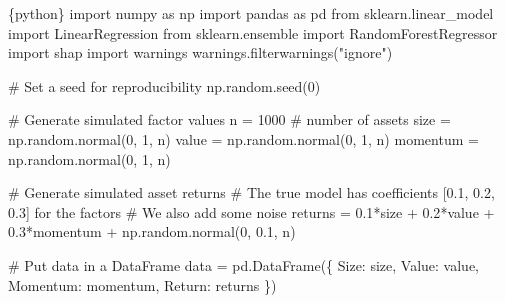 \documentclass[
  letterpaper,
  DIV=11,
  numbers=noendperiod]{scrartcl}
\newenvironment{Shaded}{\begin{snugshade}}{\end{snugshade}}
\newcommand{\CommentTok}[1]{\textcolor[rgb]{0.37,0.37,0.37}{#1}}
\newcommand{\DecValTok}[1]{\textcolor[rgb]{0.68,0.00,0.00}{#1}}
\newcommand{\FloatTok}[1]{\textcolor[rgb]{0.68,0.00,0.00}{#1}}
\newcommand{\ImportTok}[1]{\textcolor[rgb]{0.00,0.46,0.62}{#1}}
\newcommand{\InformationTok}[1]{\textcolor[rgb]{0.37,0.37,0.37}{#1}}
\newcommand{\NormalTok}[1]{\textcolor[rgb]{0.00,0.23,0.31}{#1}}
\newcommand{\OperatorTok}[1]{\textcolor[rgb]{0.37,0.37,0.37}{#1}}
\newcommand{\StringTok}[1]{\textcolor[rgb]{0.13,0.47,0.30}{#1}}
\begin{document}
\begin{Shaded}
\begin{Highlighting}[]
\InformationTok{\textasciigrave{}\textasciigrave{}\textasciigrave{}\{python\}}
\ImportTok{import}\NormalTok{ numpy }\ImportTok{as}\NormalTok{ np}
\ImportTok{import}\NormalTok{ pandas }\ImportTok{as}\NormalTok{ pd}
\ImportTok{from}\NormalTok{ sklearn.linear\_model }\ImportTok{import}\NormalTok{ LinearRegression}
\ImportTok{from}\NormalTok{ sklearn.ensemble }\ImportTok{import}\NormalTok{ RandomForestRegressor}
\ImportTok{import}\NormalTok{ shap}
\ImportTok{import}\NormalTok{ warnings}
\NormalTok{warnings.filterwarnings(}\StringTok{"ignore"}\NormalTok{)}

\CommentTok{\# Set a seed for reproducibility}
\NormalTok{np.random.seed(}\DecValTok{0}\NormalTok{)}

\CommentTok{\# Generate simulated factor values}
\NormalTok{n }\OperatorTok{=} \DecValTok{1000}  \CommentTok{\# number of assets}
\NormalTok{size }\OperatorTok{=}\NormalTok{ np.random.normal(}\DecValTok{0}\NormalTok{, }\DecValTok{1}\NormalTok{, n)}
\NormalTok{value }\OperatorTok{=}\NormalTok{ np.random.normal(}\DecValTok{0}\NormalTok{, }\DecValTok{1}\NormalTok{, n)}
\NormalTok{momentum }\OperatorTok{=}\NormalTok{ np.random.normal(}\DecValTok{0}\NormalTok{, }\DecValTok{1}\NormalTok{, n)}

\CommentTok{\# Generate simulated asset returns}
\CommentTok{\# The true model has coefficients [0.1, 0.2, 0.3] for the factors}
\CommentTok{\# We also add some noise}
\NormalTok{returns }\OperatorTok{=} \FloatTok{0.1}\OperatorTok{*}\NormalTok{size }\OperatorTok{+} \FloatTok{0.2}\OperatorTok{*}\NormalTok{value }\OperatorTok{+} \FloatTok{0.3}\OperatorTok{*}\NormalTok{momentum }\OperatorTok{+}\NormalTok{ np.random.normal(}\DecValTok{0}\NormalTok{, }\FloatTok{0.1}\NormalTok{, n)}

\CommentTok{\# Put data in a DataFrame}
\NormalTok{data }\OperatorTok{=}\NormalTok{ pd.DataFrame(\{}
    \StringTok{\textquotesingle{}Size\textquotesingle{}}\NormalTok{: size,}
    \StringTok{\textquotesingle{}Value\textquotesingle{}}\NormalTok{: value,}
    \StringTok{\textquotesingle{}Momentum\textquotesingle{}}\NormalTok{: momentum,}
    \StringTok{\textquotesingle{}Return\textquotesingle{}}\NormalTok{: returns}
\NormalTok{\})}
\InformationTok{\textasciigrave{}\textasciigrave{}\textasciigrave{}}
\end{Highlighting}
\end{Shaded}
\end{document}
